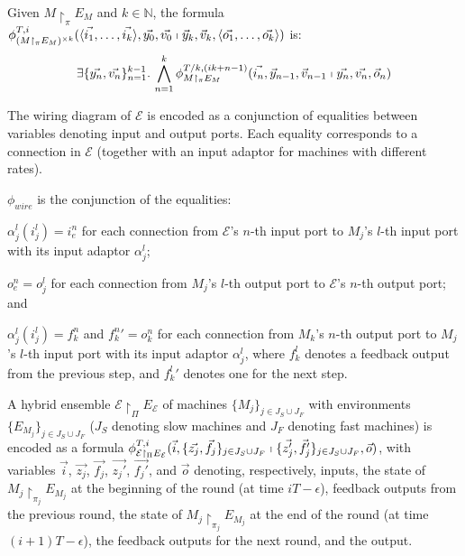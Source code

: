 \begin{definition}
Given $M \restriction_\pi E_M$ and $k \in \mathbb{N}$,
the formula
$\phi_{(M \restriction_\pi E_M)^{\times k}}^{T,
  i}(\langle\vec{i_1},\ldots,\vec{i_k}\rangle, \vec{y_0}, \vec{v_0}
\shortmid \vec{y}_{k}, \vec{v}_{k},
\langle\vec{o_1},\ldots,\vec{o_k}\rangle)$ is: 
\[
\exists\{\vec{y_n}, \vec{v_n}\}_{n=1}^{k-1}.\,
\bigwedge_{n=1}^k \phi_{M \restriction_\pi E_M}^{T/k,(ik+n-1)}(\vec{i_n}, \vec{y}_{n-1}, \vec{v}_{n-1} \shortmid \vec{y_{n}}, \vec{v_{n}}, \vec{o}_n)
\]
\end{definition}

The wiring diagram of $\mathcal{E}$ is encoded as
a conjunction of %
equalities between variables denoting input and output ports.
Each equality corresponds to a connection in $\mathcal{E}$
(together with an input adaptor for machines with different rates).


\begin{definition}
$\phi_\mathit{wire}$ is the conjunction of the equalities:
\begin{inparaenum}[(i)]
	\item $\alpha_j^l(i_j^l) = i_e^n$
	for each connection from $\mathcal{E}$'s $n$-th input port to $M_j$'s $l$-th input port 
	with its input adaptor $\alpha_j^l$;
	\item $o_e^n = o_j^l$
	for each connection from $M_j$'s $l$-th output port to $\mathcal{E}$'s $n$-th output port; and
	\item $\alpha_j^l(i_j^l) = f_k^n$ and ${f_k^n}' = o_k^n$
	for each connection from $M_k$'s $n$-th output port to $M_j$'s $l$-th input port with its input adaptor $\alpha_j^l$,
	where $f_k^l$ denotes a feedback output from the previous step, 
	and ${f_k^l}'$ denotes one for the next step.
\end{inparaenum}
\end{definition}


A hybrid ensemble $\mathcal{E} \restriction_{\Pi} E_\mathcal{E}$ 
of machines  $\{M_j\}_{j\in J_S\cup J_F}$ with %
environments $\{E_{M_j}\}_{j\in J_S\cup J_F}$
($J_S$ denoting slow machines and $J_F$ denoting fast machines) is
encoded as a formula 
$\phi_{\mathcal{E} \restriction_{\Pi} E_\mathcal{E}}^{T,i}(
	\vec{i}, \{\vec{z_j},\vec{f_j}\}_{j\in J_S\cup J_F}
	\shortmid 
	\{\vec{z'_j}, \vec{f_j'}\}_{j\in J_S\cup J_F}, \vec{o})$,
%
with variables $\vec{i}$, $\vec{z_j}$, $\vec{f_j}$, $\vec{z_j'}$,
$\vec{f_j'}$, and $\vec{o}$ denoting, respectively, 
inputs, the state of $M_j \restriction_{\pi_j} E_{M_j}$ at the beginning of the round 
		(at time $iT - \epsilon$),
feedback outputs from the previous round,
	the  state of $M_j \restriction_{\pi_j} E_{M_j}$ at the end of the round 
		(at time $(i+1)T - \epsilon$), 
the feedback outputs for the next round,	and 
the output.


